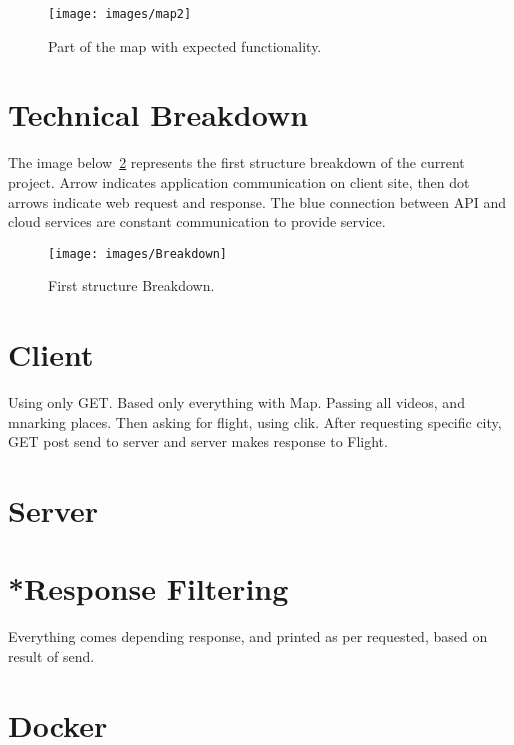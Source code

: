 \documentclass[12pt]{article}
\numberwithin{equation}{section} %
\numberwithin{figure}{section} %
\numberwithin{table}{section} %
\begin{document}
	\begin{figure}[H]
		\centering        
		\texttt{[image: images/map2]}
		\caption{Part of the map with expected functionality.}
		\label{fig:map2}
	\end{figure}
		
\newpage
\section{Technical Breakdown}	
	The image below~\ref{fig:break} represents the first structure breakdown of the current project. Arrow indicates application communication on client site, then dot arrows indicate web request and response. The blue connection between API and cloud services are constant communication to provide service.
	\begin{figure}[H]
		\centering		
		\texttt{[image: images/Breakdown]}
		\caption{First structure Breakdown.}
		\label{fig:break}
	\end{figure}	
\newpage
\section{Client}
	Using only GET. Based only everything with Map. Passing all videos, and mnarking places. Then asking for flight, using clik. After requesting specific city, GET post send to server and server makes response to Flight.		
\section{Server}

\section{*Response Filtering}
	Everything comes depending response, and printed as per requested, based on result of send.
\section{Docker}
\end{document}
